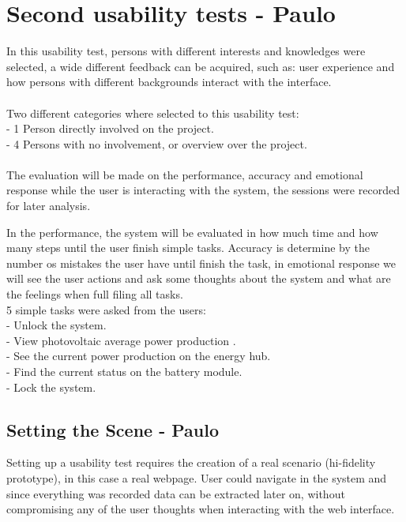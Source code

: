 \section{Second usability tests - Paulo}

In this usability test, persons with different interests and knowledges were selected, a wide different feedback can be acquired, such as: user experience and how persons with different backgrounds interact with the interface.
\\
\\Two different categories where selected to this usability test:\\
- 1 Person directly involved on the project.\\
- 4 Persons with no involvement, or overview over the project.\\
\\

The evaluation will be made on the performance, accuracy and emotional response while the user is interacting with the system, the sessions were recorded for later analysis.

In the performance, the system will be evaluated in how much time and how many steps until the user finish simple tasks. Accuracy is determine by the number os mistakes the user have until finish the task, in emotional response we will see the user actions and ask some thoughts about the system and what are the feelings when full filing all tasks.
\\
5 simple tasks were asked from the users:\\
- Unlock the system.\\
- View photovoltaic average power production .\\
- See the current power production on the energy hub.\\
- Find the current status on the battery module.\\
- Lock the system.\\

\subsection{Setting the Scene - Paulo}
Setting up a usability test requires the creation of a real scenario (hi-fidelity prototype), in this case a real webpage. User could navigate in the system and since everything was recorded data can be extracted later on, without compromising any of the user thoughts when interacting with the web interface.

